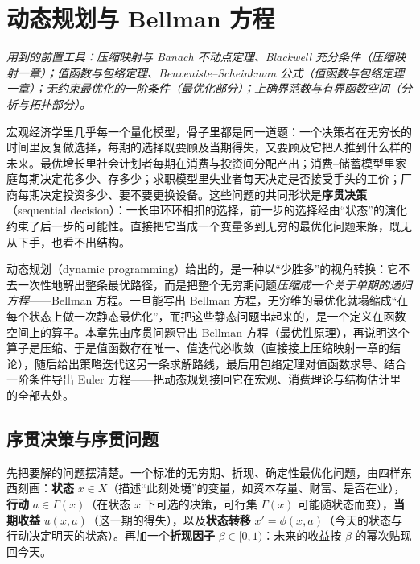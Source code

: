 \chapter{动态规划与 Bellman 方程}
\label{ch:dp}

\noindent\emph{用到的前置工具：压缩映射与 Banach 不动点定理、Blackwell 充分条件（压缩映射一章）；值函数与包络定理、Benveniste--Scheinkman 公式（值函数与包络定理一章）；无约束最优化的一阶条件（最优化部分）；上确界范数与有界函数空间（分析与拓扑部分）。}
\medskip

宏观经济学里几乎每一个量化模型，骨子里都是同一道题：一个决策者在无穷长的时间里反复做选择，每期的选择既要顾及当期得失，又要顾及它把人推到什么样的未来。最优增长里社会计划者每期在消费与投资间分配产出；消费--储蓄模型里家庭每期决定花多少、存多少；求职模型里失业者每天决定是否接受手头的工价；厂商每期决定投资多少、要不要更换设备。这些问题的共同形状是\textbf{序贯决策}（sequential decision）：一长串环环相扣的选择，前一步的选择经由``状态''的演化约束了后一步的可能性。直接把它当成一个变量多到无穷的最优化问题来解，既无从下手，也看不出结构。

动态规划（dynamic programming）给出的，是一种以``少胜多''的视角转换：它不去一次性地解出整条最优路径，而是把整个无穷期问题\emph{压缩成一个关于单期的递归方程}——Bellman 方程。一旦能写出 Bellman 方程，无穷维的最优化就塌缩成``在每个状态上做一次静态最优化''，而把这些静态问题串起来的，是一个定义在函数空间上的算子。本章先由序贯问题导出 Bellman 方程（最优性原理），再说明这个算子是压缩、于是值函数存在唯一、值迭代必收敛（直接接上压缩映射一章的结论），随后给出策略迭代这另一条求解路线，最后用包络定理对值函数求导、结合一阶条件导出 Euler 方程——把动态规划接回它在宏观、消费理论与结构估计里的全部去处。

\section{序贯决策与序贯问题}
\label{sec:dp-sequence}

先把要解的问题摆清楚。一个标准的无穷期、折现、确定性最优化问题，由四样东西刻画：\textbf{状态} $x\in X$（描述``此刻处境''的变量，如资本存量、财富、是否在业），\textbf{行动} $a\in\Gamma(x)$（在状态 $x$ 下可选的决策，可行集 $\Gamma(x)$ 可能随状态而变），\textbf{当期收益} $u(x,a)$（这一期的得失），以及\textbf{状态转移} $x'=\phi(x,a)$（今天的状态与行动决定明天的状态）。再加一个\textbf{折现因子} $\beta\in[0,1)$：未来的收益按 $\beta$ 的幂次贴现回今天。


